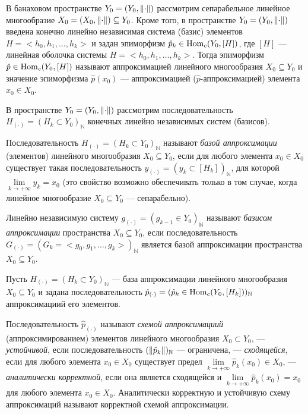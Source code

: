 
В банаховом пространстве $Y_0 = (Y_0, \norm{\cdot})$ рассмотрим сепарабельное линейное многообразие $X_0 = (X_0, \norm{\cdot}) \subseteq Y_0$. Кроме того, в пространстве $Y_0 = (Y_0, \norm{\cdot})$ введена конечно линейно независимая система (базис) элементов $H = \big<h_0, h_1, \dotsc, h_k\big>$ и задан эпиморфизм $\hat{p}_k \in \mathrm{Hom}_c(Y_0, [H])$, где $[H]$ --- линейная оболочка системы $H = \big<h_0, h_1, \dotsc, h_k\big>$. Тогда эпиморфизм $\hat{p} \in \mathrm{Hom}_c(Y_0, [H])$ называют аппроксимацией линейного многообразия $X_0 \subseteq Y_0$ и значение эпиморфизма $\hat{p}(x_0)$ --- аппроксимацией ($\hat{p}$-аппроксимацией) элемента $x_0 \in X_0$. 

\begin{definition}
	В пространстве $Y_0 = (Y_0, \norm{\cdot})$ рассмотрим последовательность $H_{(\cdot)} = (H_k \subset Y_0)_{\mathbb{N}}$ конечных линейно независимых систем (базисов).
	
	Последовательность $H_{(\cdot)} = (H_k \subset Y_0)_{\mathbb{N}}$ называют \textit{базой аппроксимации} (элементов) линейного многообразия $X_0 \subseteq Y_0$, если для любого элемента $x_0 \in X_0$ существует такая последовательность $y_{(\cdot)} = (y_k \subset [H_k])_{\mathbb{N}}$, для которой $\lim\limits_{k \to +\infty}{y_k} = x_0$ (это свойство возможно обеспечивать только в том случае, когда линейное многообразие $X_0 \subseteq Y_0$ --- сепарабельно). 
	
	Линейно независимую систему $g_{(\cdot)} = (g_{k - 1} \in Y_0)_{\mathbb{N}}$ называют \textit{базисом аппроксимации} пространства $X_0 \subseteq Y_0$, если последовательность $G_{(\cdot)} = (G_k = \big<g_0, g_1, \dotsc, g_k\big>)_{\mathbb{N}}$ является базой аппроксимации пространства $X_0 \subseteq Y_0$.
\end{definition}

\begin{definition}
	Пусть $H_{(\cdot)} = (H_k \subset Y_0)_{\mathbb{N}}$ --- база аппроксимации линейного многообразия $X_0 \subseteq Y_0$ и задана последовательность $\hat{p}_{(\cdot)} = (\hat{p}_k \in \mathrm{Hom}_c(Y_0, [H_k]))_{\mathbb{N}}$ аппроксимациий его элементов. 
	
	Последовательность $\hat{p}_{(\cdot)}$ называют \textit{схемой аппроксимациий} (аппроксимированием) элементов линейного многообразия $X_0 \subset Y_0$, --- \textit{устойчивой}, если последовательность $(\norm{\hat{p}_k})_{\mathbb{N}}$ --- ограничена, --- \textit{сходящейся}, если для любого элемента $x_0 \in X_0$ существует предел $\lim\limits_{k \to +\infty}{\hat{p}_k(x_0)} \in X_0$, --- \textit{аналитически корректной}, если она является сходящейся и $\lim\limits_{k \to +\infty}{\hat{p}_k(x_0)} = x_0$ для любого элемента $x_0 \in X_0$. Аналитически корректную и устойчивую схему аппроксимаций называют корректной схемой аппроксимации. 
\end{definition}

